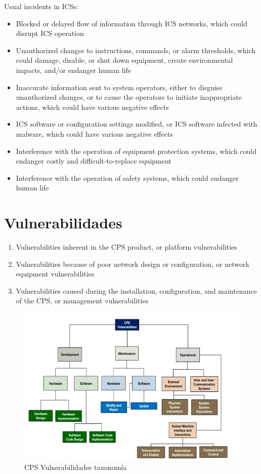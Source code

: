 Usual incidents in ICSs:
\begin{itemize}
	\item Blocked or delayed flow of information through ICS networks, which could
disrupt ICS operation
	\item Unauthorized changes to instructions, commands, or alarm thresholds, which
could damage, disable, or shut down equipment, create environmental
impacts, and/or endanger human life
	\item Inaccurate information sent to system operators, either to disguise
unauthorized changes, or to cause the operators to initiate inappropriate
actions, which could have various negative effects
	\item ICS software or configuration settings modified, or ICS software infected with
malware, which could have various negative effects
	\item Interference with the operation of equipment protection systems, which could
endanger costly and difficult-to-replace equipment
	\item Interference with the operation of safety systems, which could endanger
human life
\end{itemize}

\section{Vulnerabilidades}
\begin{enumerate}
	\item Vulnerabilities inherent in the CPS product, or platform
vulnerabilities
	\item Vulnerabilities because of poor network design or
configuration, or network equipment vulnerabilities
	\item Vulnerabilities caused during the installation, configuration,
and maintenance of the CPS, or management vulnerabilities
\end{enumerate}

\begin{figure}[htbp]
	\centering
	\includegraphics{images/07/cpsVulns.png}
	\caption{CPS Vulnerabilidades taxonomía}
	\label{fig:07/cpsVulns}
\end{figure}

